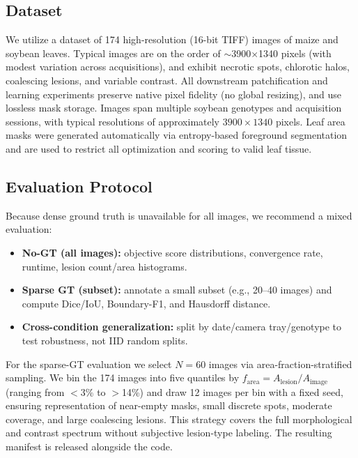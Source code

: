 \documentclass[11pt,a4paper]{article}
\begin{document}
\subsection{Dataset}
We utilize a dataset of 174 high-resolution (16-bit TIFF) images of maize and soybean leaves.
Typical images are on the order of $\sim$3900$\times$1340 pixels (with modest variation across acquisitions), and exhibit necrotic spots, chlorotic halos, coalescing lesions, and variable contrast.
All downstream patchification and learning experiments preserve native pixel fidelity (no global resizing), and use lossless mask storage.
Images span multiple soybean genotypes and acquisition sessions, with typical resolutions of approximately $3900 \times 1340$ pixels. Leaf area masks were generated automatically via entropy-based foreground segmentation and are used to restrict all optimization and scoring to valid leaf tissue.

\subsection{Evaluation Protocol}
Because dense ground truth is unavailable for all images, we recommend a mixed evaluation:
\begin{itemize}
    \item \textbf{No-GT (all images):} objective score distributions, convergence rate, runtime, lesion count/area histograms.
    \item \textbf{Sparse GT (subset):} annotate a small subset (e.g., 20--40 images) and compute Dice/IoU, Boundary-F1, and Hausdorff distance.
    \item \textbf{Cross-condition generalization:} split by date/camera tray/genotype to test robustness, not IID random splits.
\end{itemize}
For the sparse-GT evaluation we select $N{=}60$ images via area-fraction-stratified sampling. We bin the 174 images into five quantiles by $f_{\mathrm{area}} = A_{\mathrm{lesion}}/A_{\mathrm{image}}$ (ranging from $<$3\% to $>$14\%) and draw 12 images per bin with a fixed seed, ensuring representation of near-empty masks, small discrete spots, moderate coverage, and large coalescing lesions. This strategy covers the full morphological and contrast spectrum without subjective lesion-type labeling. The resulting manifest is released alongside the code.
\end{document}

